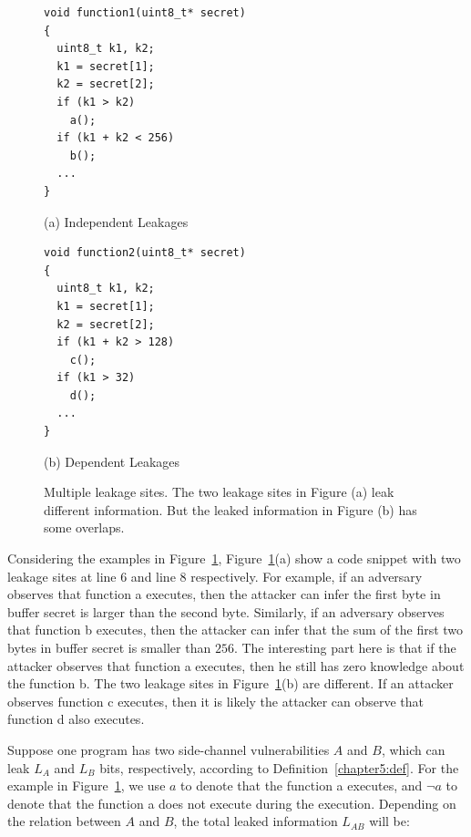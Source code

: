 \begin{figure}[h]
\begin{minipage}{0.46\linewidth}
\begin{lstlisting}
void function1(uint8_t* secret)
{
  uint8_t k1, k2;
  k1 = secret[1];
  k2 = secret[2];
  if (k1 > k2)
    a();
  if (k1 + k2 < 256)
    b();
  ...
}
\end{lstlisting}\caption*{(a) Independent Leakages}
\end{minipage}
\hfill
\begin{minipage}{0.46\linewidth}
\begin{lstlisting}
void function2(uint8_t* secret)
{
  uint8_t k1, k2;
  k1 = secret[1];
  k2 = secret[2];
  if (k1 + k2 > 128)
    c();
  if (k1 > 32)
    d();
  ...
}
\end{lstlisting} \caption*{(b) Dependent Leakages}
\end{minipage}
\caption{Multiple leakage sites. The two leakage sites in Figure (a) leak different information. But the leaked information in Figure (b) has some overlaps. }\label{chapter5:fig:multiple}
\end{figure}

Considering the examples in Figure~\ref{chapter5:fig:multiple}, Figure~\ref{chapter5:fig:multiple}(a) show a code snippet with two leakage sites at line 6 and line 8 respectively. For example, if an adversary observes that function \textsf{a} executes, then the attacker can infer the first byte in buffer \textsf{secret} is larger than the second byte.  Similarly, if an adversary observes that function \textsf{b} executes, then the attacker can infer that the sum of the first two bytes in buffer \textsf{secret} is smaller than $256$. The interesting part here is that if the attacker observes that function \textsf{a} executes, then he still has zero knowledge about the function \textsf{b}. The two leakage sites in Figure~\ref{chapter5:fig:multiple}(b) are different. If an attacker observes function \textsf{c} executes, then it is likely the attacker can observe that function \textsf{d} also executes. 

Suppose one program has two side-channel vulnerabilities $A$ and $B$, which can leak $L_A$ and $L_B$ bits, respectively, according to Definition~\ref{chapter5:def}. 
For the example in Figure~\ref{chapter5:fig:multiple}, we use $a$ to denote that the function \textsf{a} executes, and $\lnot a$ to denote that the function \textsf{a} does not execute during the execution.
Depending on the relation between $A$ and $B$, the total leaked information $L_{\mathit{AB}}$ will be:

